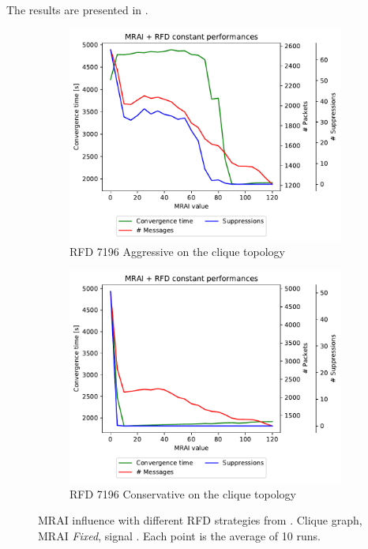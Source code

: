The results are presented in .

\begin{figure}[h]
     \centering
     \begin{subfigure}[b]{0.49\textwidth}
         \centering
         \includegraphics[width=\textwidth]{images/RFD/clique/cisco_clique10_RFD_7196_aggressive-constant_mrai_rfd_evolution.pdf}
         \caption{RFD 7196 Aggressive on the clique topology}
         \label{fig:rfd7196aggressive}
     \end{subfigure}
     \hfill
     \begin{subfigure}[b]{0.49\textwidth}
         \centering
         \includegraphics[width=\textwidth]{images/RFD/clique/cisco_clique10_RFD_7196_conservative-constant_mrai_rfd_evolution.pdf}
         \caption{RFD 7196 Conservative on the clique topology}
         \label{fig:rfd7196conservative}
     \end{subfigure}
		\caption{MRAI influence with different RFD strategies from \cite{rfc7196}.
		Clique graph, \ac{MRAI} \textit{Fixed}, signal .
		Each point is the average of \num{10} runs.}
        \label{fig:clique_rfd7196}
\end{figure}

